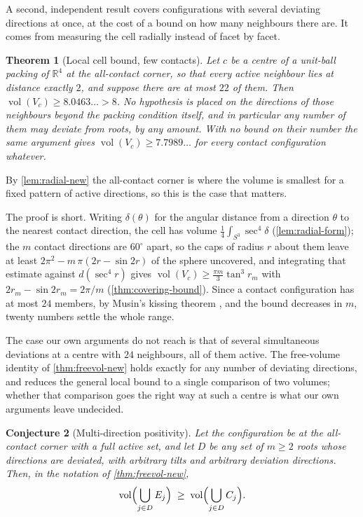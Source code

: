 \documentclass[11pt,reqno]{amsart}
\renewcommand{\_}{\origunderscore\allowbreak}
\numberwithin{equation}{section}
\theoremstyle{plain}
\newtheorem{thm}{Theorem}[section]
\newtheorem{conjecture}[thm]{Conjecture}
\theoremstyle{definition}
\theoremstyle{remark}
\DeclareMathOperator{\vol}{vol}
\begin{document}
A second, independent result covers configurations with several
deviating directions at once, at the cost of a bound on how many
neighbours there are. It comes from measuring the cell radially instead of facet by facet.

\begin{thm}[Local cell bound, few contacts]\label{thm:local-fewcontacts}
Let $c$ be a centre of a unit-ball packing of $\mathbb{R}^4$ at the
all-contact corner, so that every active neighbour lies at distance
exactly $2$, and suppose there are at most $22$ of them. Then
$\vol(V_c)\ge8.0463\ldots>8$. No hypothesis is placed on the directions
of those neighbours beyond the packing condition itself, and in
particular any number of them may deviate from roots, by any amount.
With no bound on their number the same argument gives
$\vol(V_c)\ge7.7989\ldots$ for every contact configuration whatever.
\end{thm}

By \cref{lem:radial-new} the all-contact corner is where the volume is
smallest for a fixed pattern of active directions, so this is the case
that matters.

The proof is short. Writing $\delta(\theta)$ for the angular distance
from a direction $\theta$ to the nearest contact direction, the cell has
volume $\tfrac14\int_{S^3}\sec^4\delta$ (\cref{lem:radial-form}); the
$m$ contact directions are $60^\circ$ apart, so the caps of radius $r$
about them leave at least $2\pi^2-m\,\pi(2r-\sin2r)$ of the sphere
uncovered, and integrating that estimate against $d(\sec^4r)$ gives
$\vol(V_c)\ge\tfrac{\pi m}{3}\tan^3r_m$ with $2r_m-\sin2r_m=2\pi/m$
(\cref{thm:covering-bound}). Since a contact configuration has at most
$24$ members, by Musin's kissing theorem \cite{Mus08}, and the bound
decreases in $m$, twenty numbers settle the whole range.

The case our own arguments do not reach is that of several simultaneous
deviations at a centre with $24$ neighbours, all of them active. The
free-volume identity of \cref{thm:freevol-new} holds exactly for any
number of deviating directions, and reduces the general local bound to
a single comparison of two volumes; whether that comparison goes the
right way at such a centre is what our own arguments leave undecided.

\begin{conjecture}[Multi-direction positivity]\label{conj:multidir-new}
Let the configuration be at the all-contact corner with a full active
set, and let $D$ be any set of $m\ge2$ roots whose directions are
deviated, with arbitrary tilts and arbitrary deviation directions. Then,
in the notation of \cref{thm:freevol-new},
\[
  \vol\Bigl(\bigcup_{j\in D}E_j\Bigr)
  \;\ge\;
  \vol\Bigl(\bigcup_{j\in D}C_j\Bigr).
\]
\end{conjecture}
\end{document}
